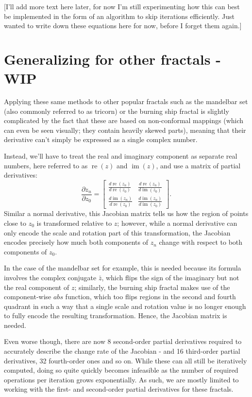 \documentclass[12pt,a4paper]{article}
\newcommand{\mat}[1]{\begin{bmatrix} #1 \end{bmatrix}}
\DeclareMathOperator{\re}{re}
\DeclareMathOperator{\im}{im}
\begin{document}
[I'll add more text here later, for now I'm still experimenting how this can best be implemented in the form of an algorithm to skip iterations efficiently. Just wanted to write down these equations here for now, before I forget them again.]

\section{Generalizing for other fractals - WIP}

Applying these same methods to other popular fractals such as the mandelbar set (also commonly referred to as tricorn) or the burning ship fractal is slightly complicated by the fact that these are based on non-conformal mappings (which can even be seen visually; they contain heavily skewed parts), meaning that their derivative can't simply be expressed as a single complex number.

Instead, we'll have to treat the real and imaginary component as separate real numbers, here referred to as $\re(z)$ and $\im(z)$, and use a matrix of partial derivatives:
$$\frac{\partial z_n}{\partial z_0} = \mat{\frac{d\re(z_n)}{d\re(z_0)}&\frac{d\re(z_n)}{d\im(z_0)}\\\frac{d\im(z_n)}{d\re(z_0)}&\frac{d\im(z_n)}{d\im(z_0)}}.$$
Similar a normal derivative, this Jacobian matrix tells us how the region of points close to $z_0$ is transformed relative to $z$; however, while a normal derivative can only encode the scale and rotation part of this transformation, the Jacobian encodes precisely how much both components of $z_n$ change with respect to both components of $z_0$.

In the case of the mandelbar set for example, this is needed because its formula involves the complex conjugate $\bar{z}$, which flips the sign of the imaginary but not the real component of $z$; similarly, the burning ship fractal makes use of the component-wise $abs$ function, which too flips regions in the second and fourth quadrant in such a way that a single scale and rotation value is no longer enough to fully encode the resulting transformation. Hence, the Jacobian matrix is needed.

Even worse though, there are now 8 second-order partial derivatives required to accurately describe the change rate of the Jacobian - and 16 third-order partial derivatives, 32 fourth-order ones and so on.
While these can all still be iteratively computed, doing so quite quickly becomes infeasible as the number of required operations per iteration grows exponentially. As such, we are mostly limited to working with the first- and second-order partial derivatives for these fractals.
\end{document}
